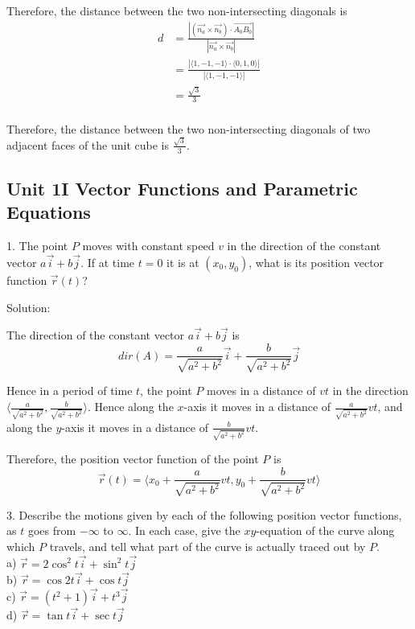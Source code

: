 \documentclass{article}
\begin{document}
Therefore, the distance between the two non-intersecting diagonals is
\begin{equation*}
  \begin{split}
    d &= \frac{|(\vec{n_a} \times \vec{n_b}) \cdot \vec{A_0B_0}|}{|\vec{n_a} \times \vec{n_b}|} \\
      &= \frac{|\langle 1, -1, -1 \rangle \cdot \langle 0, 1, 0 \rangle|}{|\langle 1, -1, -1 \rangle|} \\
      &= \frac{\sqrt{3}}{3} \\
  \end{split}
\end{equation*}

Therefore, the distance between the two non-intersecting diagonals of two 
adjacent faces of the unit cube is $\frac{\sqrt{3}}{3}$.

\subsection*{Unit 1I Vector Functions and Parametric Equations}

\bigskip

1. The point $P$ moves with constant speed $v$ in the direction of the constant 
vector $a \vec{i} + b \vec{j}$. If at time $t = 0$ it is at $(x_0, y_0)$, what 
is its position vector function $\vec{r}(t)$?

Solution:

The direction of the constant vector $a \vec{i} + b \vec{j}$ is
\begin{equation*}
  dir(A) = \frac{a}{\sqrt{a^2 + b^2}} \vec{i} + \frac{b}{\sqrt{a^2 + b^2}} \vec{j}
\end{equation*}

Hence in a period of time $t$, the point $P$ moves in a distance of $vt$ in the 
direction 
$\langle \frac{a}{\sqrt{a^2 + b^2}}, \frac{b}{\sqrt{a^2 + b^2}} \rangle$. Hence 
along the $x$-axis it moves in a distance of $\frac{a}{\sqrt{a^2 + b^2}} vt$, 
and along the $y$-axis it moves in a distance of 
$\frac{b}{\sqrt{a^2 + b^2}} vt$.

Therefore, the position vector function of the point $P$ is
\begin{equation*}
  \vec{r}(t) = \langle x_0 + \frac{a}{\sqrt{a^2 + b^2}} vt, y_0 + \frac{b}{\sqrt{a^2 + b^2}} vt \rangle
\end{equation*}

\bigskip

3. Describe the motions given by each of the following position vector 
functions, as $t$ goes from $-\infty$ to $\infty$. In each case, give the 
$xy$-equation of the curve along which $P$ travels, and tell what part of the 
curve is actually traced out by $P$. \\
a) $\vec{r} = 2 \cos^2 t \vec{i} + \sin^2 t \vec{j}$ \\
b) $\vec{r} = \cos 2t \vec{i} + \cos t \vec{j}$ \\
c) $\vec{r} = (t^2 + 1) \vec{i} + t^3 \vec{j}$ \\
d) $\vec{r} = \tan t \vec{i} + \sec t \vec{j}$
\end{document}
